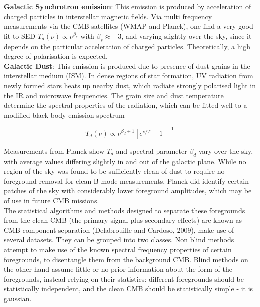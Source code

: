 \documentclass[a4paper,10pt]{article}
\begin{document}
\textbf{Galactic Synchrotron emission}: This emission is produced by acceleration of charged particles in interstellar magnetic fields. Via multi frequency measurements via the CMB satellites (WMAP and Planck), one find a very good fit to SED $T_d(\nu) \propto \nu^{\beta_s}$ with $\beta_s \approx -3$, and varying slightly over the sky, since it depends on the particular acceleration of charged particles. Theoretically, a high degree of polarisation is expected.\\

\textbf{Galactic Dust}: This emission is produced due to presence of dust grains in the interstellar medium (ISM). In dense regions of star formation, UV radiation from newly formed stars heats up nearby dust, which radiate strongly polarised light in the IR and microwave frequencies. The grain size and dust temperature determine the spectral properties of the radiation, which can be fitted well to a modified black body emission spectrum

\begin{equation}
T_d(\nu) \propto \nu ^ {\beta_d+1}[e^{\nu/T}-1]^{-1}
\end{equation}

Measurements from Planck show $T_d$ and spectral parameter $\beta_d$ vary over the sky, with average values differing slightly in and out of the galactic plane. While no region of the sky was found to be sufficiently clean of dust to require no foreground removal for clean B mode measurements, Planck did identify certain patches of the sky with considerably lower foreground amplitudes, which may be of use in future CMB missions. \\


The statistical algorithms and methods designed to separate these foregrounds from the clean CMB (the primary signal plus secondary effects) are known as CMB component separation (Delabrouille and Cardoso, 2009), make use of several datasets. They can be grouped into two classes. Non blind methods attempt to make use of the known spectral frequency properties of certain foregrounds, to disentangle them from the background CMB. Blind methods on the other hand assume little or no prior information about the form of the foregrounds, instead relying on their statistics: different foregrounds should be statistically independent, and the clean CMB should be statistically simple - it is gaussian.\\
\end{document}
